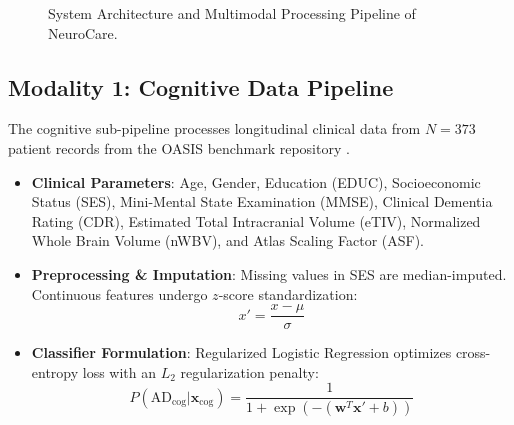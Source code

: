 \documentclass[conference]{IEEEtran}
\begin{document}
\begin{figure}[h!]
\caption{System Architecture and Multimodal Processing Pipeline of NeuroCare.}
\label{fig:architecture}
\end{figure}

\subsection{Modality 1: Cognitive Data Pipeline}
The cognitive sub-pipeline processes longitudinal clinical data from $N = 373$ patient records from the OASIS benchmark repository \cite{marcus2007}.
\begin{itemize}
    \item \textbf{Clinical Parameters}: Age, Gender, Education (EDUC), Socioeconomic Status (SES), Mini-Mental State Examination (MMSE), Clinical Dementia Rating (CDR), Estimated Total Intracranial Volume (eTIV), Normalized Whole Brain Volume (nWBV), and Atlas Scaling Factor (ASF).
    \item \textbf{Preprocessing \& Imputation}: Missing values in SES are median-imputed. Continuous features undergo $z$-score standardization:
    \begin{equation}
    x' = \frac{x - \mu}{\sigma}
    \end{equation}
    \item \textbf{Classifier Formulation}: Regularized Logistic Regression optimizes cross-entropy loss with an $L_2$ regularization penalty:
    \begin{equation}
    P(\text{AD}_{\text{cog}} | \mathbf{x}_{\text{cog}}) = \frac{1}{1 + \exp\left(-(\mathbf{w}^T \mathbf{x}' + b)\right)}
    \end{equation}
\end{itemize}
\end{document}
